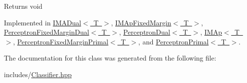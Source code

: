\begin{DoxyReturn}{Returns}
void 
\end{DoxyReturn}


Implemented in \mbox{\hyperlink{class_i_m_a_dual_aff820af6454ceeef4d23af48476d7218}{I\+M\+A\+Dual$<$ T $>$}}, \mbox{\hyperlink{class_i_m_ap_fixed_margin_a4d99742be5fe5a21b8ae6f99547a98c8}{I\+M\+Ap\+Fixed\+Margin$<$ T $>$}}, \mbox{\hyperlink{class_perceptron_fixed_margin_dual_a58a5acdd6afaedff53fab23779f01486}{Perceptron\+Fixed\+Margin\+Dual$<$ T $>$}}, \mbox{\hyperlink{class_perceptron_dual_ac5e6aac8184fdf8f9d39d8d183d49190}{Perceptron\+Dual$<$ T $>$}}, \mbox{\hyperlink{class_i_m_ap_aa8bf6b0d21a76d388fe81ee516b627e4}{I\+M\+Ap$<$ T $>$}}, \mbox{\hyperlink{class_perceptron_fixed_margin_primal_a6d4a14b9f39a4fef45de201edfeabce0}{Perceptron\+Fixed\+Margin\+Primal$<$ T $>$}}, and \mbox{\hyperlink{class_perceptron_primal_ac6cafe7a8fabfb607761024ce60a6861}{Perceptron\+Primal$<$ T $>$}}.



The documentation for this class was generated from the following file\+:\begin{DoxyCompactItemize}
\item 
includes/\mbox{\hyperlink{_classifier_8hpp}{Classifier.\+hpp}}\end{DoxyCompactItemize}

